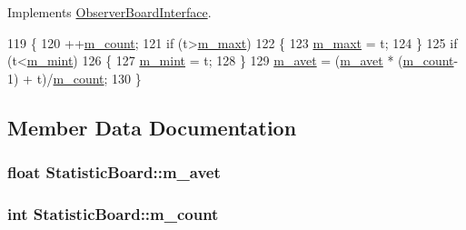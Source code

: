 Implements \hyperlink{classObserverBoardInterface_ae480934d1ef4e49ed6d862ea9f926573}{Observer\+Board\+Interface}.


\begin{DoxyCode}
119     \{
120         ++\hyperlink{classStatisticBoard_ad08df42fbc4bfd6a738d70c7bb275d27}{m\_count};
121         \textcolor{keywordflow}{if} (t>\hyperlink{classStatisticBoard_ae44658877f1ef0413ab0212671de455a}{m\_maxt})
122         \{
123             \hyperlink{classStatisticBoard_ae44658877f1ef0413ab0212671de455a}{m\_maxt} = t;
124         \}
125         \textcolor{keywordflow}{if} (t<\hyperlink{classStatisticBoard_a7d8f109c876c413a035c356e19f59b6f}{m\_mint})
126         \{
127             \hyperlink{classStatisticBoard_a7d8f109c876c413a035c356e19f59b6f}{m\_mint} = t;
128         \}
129         \hyperlink{classStatisticBoard_a942352228021cc8ab83848ffd2c2e92e}{m\_avet} = (\hyperlink{classStatisticBoard_a942352228021cc8ab83848ffd2c2e92e}{m\_avet} * (\hyperlink{classStatisticBoard_ad08df42fbc4bfd6a738d70c7bb275d27}{m\_count}-1) + t)/\hyperlink{classStatisticBoard_ad08df42fbc4bfd6a738d70c7bb275d27}{m\_count};
130     \}
\end{DoxyCode}


\subsection{Member Data Documentation}
\subsubsection[{\texorpdfstring{m\+\_\+avet}{m_avet}}]{\setlength{\rightskip}{0pt plus 5cm}float Statistic\+Board\+::m\+\_\+avet\hspace{0.3cm}{\ttfamily [private]}}\hypertarget{classStatisticBoard_a942352228021cc8ab83848ffd2c2e92e}{}\label{classStatisticBoard_a942352228021cc8ab83848ffd2c2e92e}
\subsubsection[{\texorpdfstring{m\+\_\+count}{m_count}}]{\setlength{\rightskip}{0pt plus 5cm}int Statistic\+Board\+::m\+\_\+count\hspace{0.3cm}{\ttfamily [private]}}\hypertarget{classStatisticBoard_ad08df42fbc4bfd6a738d70c7bb275d27}{}\label{classStatisticBoard_ad08df42fbc4bfd6a738d70c7bb275d27}
